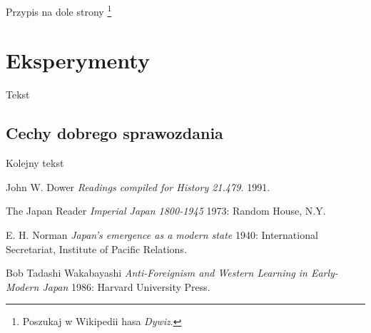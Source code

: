 \documentclass{article}
\begin{document}
Przypis na dole strony \footnote{Poszukaj w Wikipedii hasa \emph{Dywiz}.}



\clearpage %


\section{Eksperymenty}
\label{sec-eksperymenty}

Tekst

\subsection{Cechy dobrego sprawozdania}

Kolejny tekst \cite{norman}



%
%

\begin{thebibliography}{1}

 John W. Dower {\em Readings compiled for History
  21.479.}  1991.

  The Japan Reader {\em Imperial Japan 1800-1945} 1973:
  Random House, N.Y.

 E. H. Norman {\em Japan's emergence as a modern
  state} 1940: International Secretariat, Institute of Pacific
  Relations.

 Bob Tadashi Wakabayashi {\em Anti-Foreignism and Western
  Learning in Early-Modern Japan} 1986: Harvard University Press.

\end{thebibliography}
\end{document}
